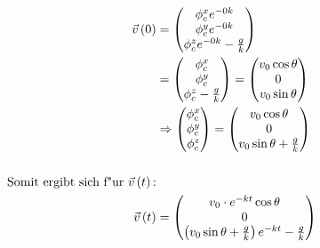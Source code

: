 \documentclass{theozettel}
\begin{document}
\begin{align*}
\vec{v}\left(0\right)&=\mqty(\phi_c^xe^{-0k}\\\phi_c^ye^{-0k}\\\phi_c^ze^{-0k}-\frac{g}{k})\\
&=\mqty(\phi_c^x\\\phi_c^y\\\phi_c^z-\frac{g}{k})=\mqty(v_0\cos\theta\\0\\v_0\sin\theta)\\
&\Rightarrow\mqty(\phi_c^x\\\phi_c^y\\\phi_c^z)=\mqty(v_0\cos\theta\\0\\v_0\sin\theta+\frac{g}{k})\\\\
\text{Somit ergibt sich f"ur} \ \vec{v}\left(t\right)\text{:}\\
\vec{v}\left(t\right)&=\mqty(v_0\cdot e^{-kt}\cos\theta\\0\\\left(v_0\sin\theta+\frac{g}{k}\right)e^{-kt}-\frac{g}{k})
\end{align*}
\endgroup
\newpage
\end{document}
